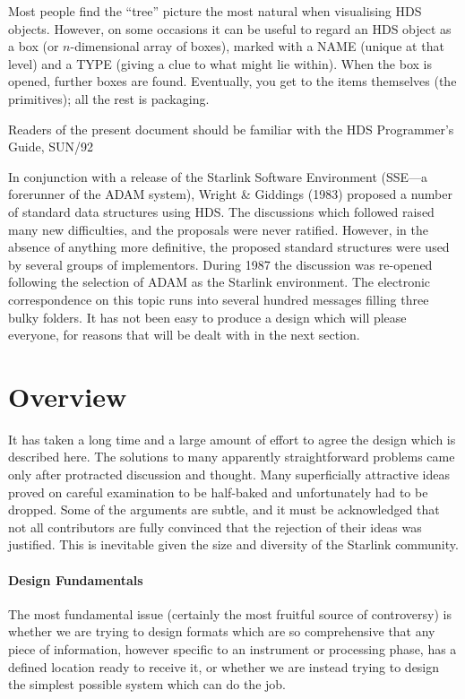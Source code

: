 \documentclass[twoside,11pt]{article}
\newcommand{\xref}[3]{#1}
\newcommand{\xlabel}[1]{}
\renewcommand{\_}{\texttt{\symbol{95}}}
\begin{document}
Most people find the ``tree'' picture the most natural when
visualising HDS objects.  However, on some occasions it can
be useful to regard an HDS object as a box (or $n$-dimensional
array of boxes), marked with a NAME (unique at that level)
and a TYPE (giving a clue to what might lie within).  When
the box is opened, further boxes are found.  Eventually,
you get to the items themselves (the primitives);  all the
rest is packaging.

Readers of the present document
should be familiar with the HDS Programmer's Guide, \xref{SUN/92}{sun92}.

In conjunction with a release of
the Starlink Software Environment ({\small SSE}---a forerunner of the
{\small ADAM} system),
Wright \& Giddings (1983) proposed a number of standard data structures
using HDS.  The discussions which followed raised many
new difficulties, and the proposals were never
ratified.  However, in the absence of anything more definitive,
the proposed standard structures were used by several
groups of implementors.  During 1987 the discussion was re-opened
following the selection of {\small ADAM} as the Starlink environment.  The
electronic correspondence on this topic runs into several hundred
messages filling three bulky
folders.  It has not been easy to produce a design which
will please everyone, for reasons that will be dealt with
in the next section.

\section{\xlabel{se_overview}Overview\label{se:overview}}

It has taken a long time and a large amount of effort
to agree the design which is described here.
The solutions to many apparently
straightforward problems came only after
protracted discussion and
thought.  Many superficially attractive ideas proved on careful
examination to be half-baked and unfortunately had to be dropped.
Some of the arguments are subtle, and it must be acknowledged that
not all contributors are fully convinced that the rejection
of their ideas was justified.  This is inevitable given the
size and diversity of the Starlink community.

\paragraph{Design Fundamentals}
The most fundamental issue (certainly the
most fruitful source of controversy) is whether we are
trying to design formats which are so comprehensive that
any piece of information, however specific to an instrument or
processing phase, has a defined location ready to receive
it, or whether we are instead trying to design
the simplest possible system which can do the job.
\end{document}
